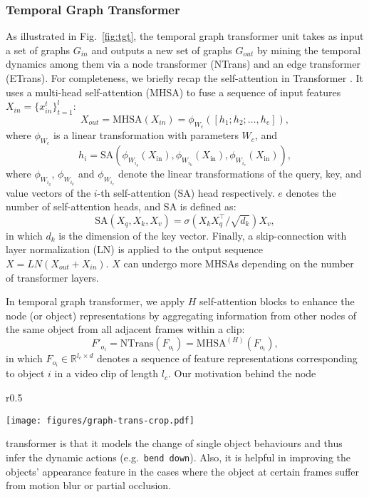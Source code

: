 \documentclass[runningheads]{llncs}
\newcommand{\eg}{e.g.}
\begin{document}
\subsubsection{Temporal Graph Transformer}
As illustrated in Fig.~\ref{fig:tgt}, the temporal graph transformer unit takes as input a set of graphs $G_{in}$ and outputs a new 
set of graphs $G_{out}$ by mining the temporal dynamics among them via a node transformer (NTrans) and an edge transformer (ETrans). 
For completeness, we briefly recap the self-attention in Transformer \cite{vaswani2017attention}. It uses a multi-head self-attention (MHSA) to fuse a sequence of input features $X_{in}=\{x_{in}^t\}_{t=1}^l$:
\begin{equation}
X_{out} = \text{MHSA}(X_{in}) = \phi_{W_c}([h_1;h_2;\dots,h_e]),
\end{equation}
where $\phi_{W_c}$ is a linear transformation with parameters $W_c$, and
\begin{equation}
    h_i = \text{SA}(\phi_{W_{i_q}}(X_{\text{in}}), \phi_{W_{i_k}}(X_{\text{in}}), \phi_{W_{i_v}}(X_{\text{in}})),
\end{equation}
where $\phi_{W_{i_q}}$, $\phi_{W_{i_k}}$ and $\phi_{W_{i_v}}$ denote the linear transformations of the query, key, and value vectors of the $i$-th self-attention (SA) head respectively. $e$ denotes the number of self-attention heads, and SA is defined as:
\begin{equation}
    \text{SA}(X_q, X_k, X_v) = \sigma\left({X_k X_q^\mathrm{\top}/\sqrt{d_k}}\right)X_v, 
\end{equation}
in which $d_k$ is the dimension of the key vector. Finally, a skip-connection with layer normalization (LN) is applied to the output sequence $X=LN(X_{out}+X_{in})$. $X$ can undergo more MHSAs depending on the number of transformer layers.

In  temporal graph transformer, we apply $H$ self-attention blocks to enhance the node (or object) representations by aggregating information from other nodes of the same object from all adjacent frames within a clip:
\begin{equation}
\label{equ:node}
    F'_{o_i} = \text{NTrans}(F_{o_i})=\text{MHSA}^{(H)}(F_{o_i}),
\end{equation}
in which $F_{o_i} \in \mathbb{R}^{l_c \times d}$ denotes a sequence of feature representations corresponding to object $i$ in a video clip of length $l_c$. Our motivation behind the node
\begin{wrapfigure}[12]{r}{0.5\textwidth}
 \vspace{-10pt}
  \begin{center}
    \texttt{[image: figures/graph-trans-crop.pdf]}
  \end{center}
   \vspace{-20pt}
  \caption{Illustration of temporal graph transformer in a short video clip.}
  \label{fig:tgt}
\end{wrapfigure}
transformer is that it models the change of single object behaviours and thus infer the dynamic actions (\eg~\texttt{bend down}). Also, it is helpful in improving the objects' appearance feature in the cases where the object at certain frames suffer from motion blur or partial occlusion.
\end{document}
